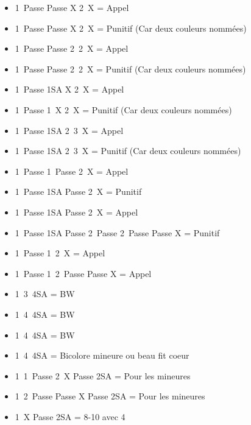 \documentclass[a4paper, oneside, 11pt]{report}
\begin{document}
\begin{itemize}
	\item 1\pique\ Passe Passe X 2\pique\ X = Appel
	\item 1\pique\ Passe Passe X 2\carreau\ X = Punitif (Car deux couleurs nommées)
	\item 1\pique\ Passe Passe 2\trefle\ 2\pique\ X = Appel
	\item 1\pique\ Passe Passe 2\trefle\ 2\carreau\ X = Punitif (Car deux couleurs nommées)
	\item 1\carreau\ Passe 1SA X 2\carreau\ X = Appel
	\item 1\carreau\ Passe 1\coeur\ X 2\carreau\ X = Punitif (Car deux couleurs nommées)
	\item 1\carreau\ Passe 1SA 2\pique\ 3\carreau\ X = Appel
	\item 1\carreau\ Passe 1SA 2\pique\ 3\trefle\ X = Punitif (Car deux couleurs nommées)\\

	\item 1\coeur\ Passe 1\pique\ Passe 2\coeur\ X = Appel
	\item 1\coeur\ Passe 1SA Passe 2\coeur\ X = Punitif
	\item 1\coeur\ Passe 1SA Passe 2\trefle\ X  = Appel
	\item 1\coeur\ Passe 1SA Passe 2\trefle\ Passe 2\coeur\ Passe Passe X  = Punitif\\

	\item 1\carreau\ Passe 1\coeur\ 2\coeur\ X = Appel
	\item 1\carreau\ Passe 1\coeur\ 2\coeur\ Passe Passe X = Appel\\

	\item 1\coeur\ 3\pique\ 4SA = BW \coeur
	\item 1\coeur\ 4\carreau\ 4SA = BW \coeur
	\item 1\pique\ 4\coeur\ 4SA = BW \pique
	\item 1\coeur\ 4\pique\ 4SA = Bicolore mineure ou beau fit coeur\\
	
	\item 1\trefle\ 1\coeur\ Passe 2\coeur\ X Passe 2SA = Pour les mineures
	\item 1\trefle\ 2\coeur\ Passe Passe X Passe 2SA = Pour les mineures\\

	\item 1\pique\ X Passe 2SA = 8-10 avec 4\coeur
	\end{itemize}
\end{document}
